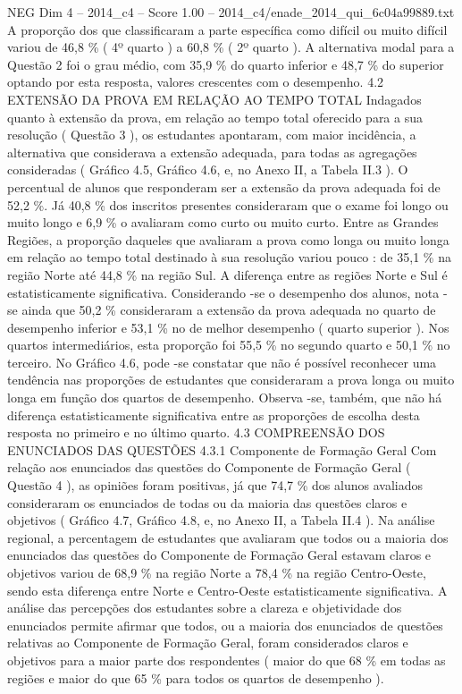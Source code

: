 \begin{textsample}{NEG Dim 4 – 2014\_c4 – Score 1.00 – 2014\_c4/enade\_2014\_qui\_6c04a99889.txt}
A proporção dos que classificaram a parte específica como difícil ou muito difícil variou de 46,8 \% ( 4º quarto ) a 60,8 \% ( 2º quarto ).
A alternativa modal para a Questão 2 foi o grau médio, com 35,9 \% do quarto inferior e 48,7 \% do superior optando por esta resposta, valores crescentes com o desempenho. 4.2 EXTENSÃO DA PROVA EM RELAÇÃO AO TEMPO TOTAL Indagados quanto à extensão da prova, em relação ao tempo total oferecido para a sua resolução ( Questão 3 ), os estudantes apontaram, com maior incidência, a alternativa que considerava a extensão adequada, para todas as agregações consideradas ( Gráfico 4.5, Gráfico 4.6, e, no Anexo II, a Tabela II.3 ).
O percentual de alunos que responderam ser a extensão da prova adequada foi de 52,2 \%.
Já 40,8 \% dos inscritos presentes consideraram que o exame foi longo ou muito longo e 6,9 \% o avaliaram como curto ou muito curto.
Entre as Grandes Regiões, a proporção daqueles que avaliaram a prova como longa ou muito longa em relação ao tempo total destinado à sua resolução variou pouco : de 35,1 \% na região Norte até 44,8 \% na região Sul.
A diferença entre as regiões Norte e Sul é estatisticamente significativa.
Considerando -se o desempenho dos alunos, nota -se ainda que 50,2 \% consideraram a extensão da prova adequada no quarto de desempenho inferior e 53,1 \% no de melhor desempenho ( quarto superior ).
Nos quartos intermediários, esta proporção foi 55,5 \% no segundo quarto e 50,1 \% no terceiro.
No Gráfico 4.6, pode -se constatar que não é possível reconhecer uma tendência nas proporções de estudantes que consideraram a prova longa ou muito longa em função dos quartos de desempenho.
Observa -se, também, que não há diferença estatisticamente significativa entre as proporções de escolha desta resposta no primeiro e no último quarto. 4.3 COMPREENSÃO DOS ENUNCIADOS DAS QUESTÕES 4.3.1 Componente de Formação Geral Com relação aos enunciados das questões do Componente de Formação Geral ( Questão 4 ), as opiniões foram positivas, já que 74,7 \% dos alunos avaliados consideraram os enunciados de todas ou da maioria das questões claros e objetivos ( Gráfico 4.7, Gráfico 4.8, e, no Anexo II, a Tabela II.4 ).
Na análise regional, a percentagem de estudantes que avaliaram que todos ou a maioria dos enunciados das questões do Componente de Formação Geral estavam claros e objetivos variou de 68,9 \% na região Norte a 78,4 \% na região Centro-Oeste, sendo esta diferença entre Norte e Centro-Oeste estatisticamente significativa.
A análise das percepções dos estudantes sobre a clareza e objetividade dos enunciados permite afirmar que todos, ou a maioria dos enunciados de questões relativas ao Componente de Formação Geral, foram considerados claros e objetivos para a maior parte dos respondentes ( maior do que 68 \% em todas as regiões e maior do que 65 \% para todos os quartos de desempenho ).

\end{textsample}
